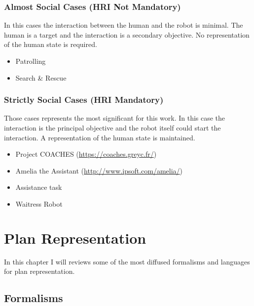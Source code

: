 \documentclass[pdftex,12pt,a4paper]{report}
\begin{document}
\subsection{Almost Social Cases (HRI Not Mandatory)}
In this cases the interaction between the human and the robot is minimal. The human is a target and the interaction is a secondary objective. No representation of the human state is required.
\begin{itemize}
\item Patrolling
\item Search \& Rescue
\end{itemize}

\subsection{Strictly Social Cases (HRI Mandatory)}
Those cases represents the most significant for this work. In this case the interaction is the principal objective and the robot itself could start the interaction. A representation of the human state is maintained.
\begin{itemize}
\item Project COACHES (\url{https://coaches.greyc.fr/})
\item Amelia the Assistant (\url{http://www.ipsoft.com/amelia/})
\item Assistance task
\item Waitress Robot
\end{itemize}
\noindent

\chapter{Plan Representation}\label{sec:formalism}
In this chapter I will reviews some of the most diffused formalisms and languages for plan representation.
\section{Formalisms}\label{sec:formalism}
\end{document}
